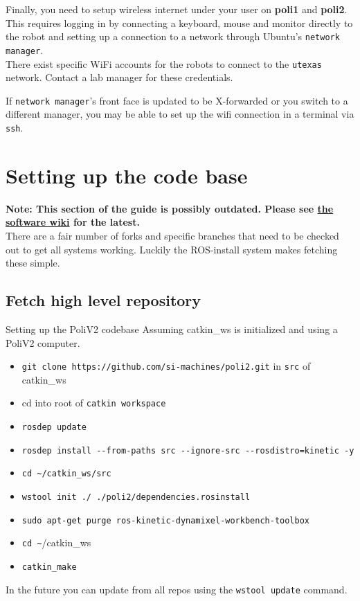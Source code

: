 Finally, you need to setup wireless internet under your user on \textbf{poli1} and \textbf{poli2}. 
This requires logging in by connecting a keyboard, mouse and monitor directly to the robot and setting up a connection to a network through Ubuntu's \texttt{network manager}. \\

There exist specific WiFi accounts for the robots to connect to the \texttt{utexas} network. Contact a lab manager for these credentials.

If \texttt{network manager}'s front face is updated to be X-forwarded or you switch to a different manager, you may be able to set up the wifi connection in a terminal via \texttt{ssh}.


\section{Setting up the code base}
\textbf{Note: This section of the guide is possibly outdated. Please see \href{https://github.com/si-machines/poli2/wiki}{the software wiki} for the latest.} \\

There are a fair number of forks and specific branches that need to be checked out to get all systems working.
Luckily the ROS-install system makes fetching these simple.

\subsection{Fetch high level repository}

\begin{example}{Setting up the PoliV2 codebase}
  \label{ex:poli2_codebase_setup}
  Assuming catkin\_ws is initialized and using a PoliV2 computer. \\
  \begin{itemize}
    \item \texttt{git clone https://github.com/si-machines/poli2.git} in \texttt{src} of catkin\_ws
    \item cd into root of \texttt{catkin workspace}
    \item \texttt{rosdep update}
    \item \texttt{rosdep install -{}-from-paths src -{}-ignore-src -{}-rosdistro=kinetic -y}
    \item \texttt{cd \textasciitilde/catkin\_ws/src} 
	\item \texttt{wstool init ./ ./poli2/dependencies.rosinstall}
    \item \texttt{sudo apt-get purge ros-kinetic-dynamixel-workbench-toolbox}
    \item \texttt{cd \textasciitilde}/catkin\_ws
    \item \texttt{catkin\_make}
  \end{itemize}
  In the future you can update from all repos using the \texttt{wstool update} command.
\end{example}


